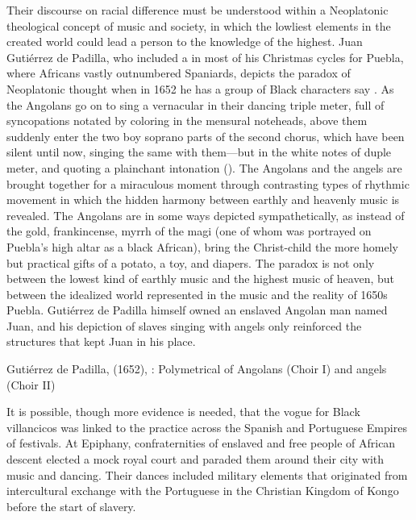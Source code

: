 Their discourse on racial difference must be understood within a Neoplatonic
theological concept of music and society, in which the lowliest elements in the
created world could lead a person to the knowledge of the highest.
Juan Gutiérrez de Padilla, who included a  in most of
his Christmas cycles for Puebla, where Africans vastly outnumbered Spaniards,
depicts the paradox of Neoplatonic thought when in 1652 he has a group of
Black characters say .%
   \Autocite{Sierra:UrbanSlavery} 
As the Angolans go on to sing a vernacular  in their
dancing triple meter, full of syncopations notated by coloring in the mensural
noteheads, above them suddenly enter the two boy soprano parts of the second
chorus, which have been silent until now, singing the same  with
them---but in the white notes of duple meter, and quoting a plainchant
intonation ().
The Angolans and the angels are brought together for a miraculous moment
through contrasting types of rhythmic movement in which the hidden harmony
between earthly and heavenly music is revealed.
The Angolans are in some ways depicted sympathetically, as instead
of the gold, frankincense, myrrh of the magi (one of whom was portrayed on
Puebla's high altar as a black African), bring the Christ-child the more homely
but practical gifts of a potato, a toy, and diapers.
The paradox is not only between the lowest kind of earthly music and the
highest music of heaven, but between the idealized world represented in the
music and the reality of 1650s Puebla.
Gutiérrez de Padilla himself owned an enslaved Angolan man named Juan, and
his depiction of slaves singing with angels only reinforced the structures that
kept Juan in his place.%
    \Autocite{Mauleon:PadillaCivil}


{Gutiérrez de Padilla,  (1652), :
Polymetrical  of Angolans (Choir I) and angels (Choir II)}

It is possible, though more evidence is needed, that the vogue for Black
villancicos was linked to the practice across the Spanish and Portuguese
Empires of  festivals.
At Epiphany, confraternities of enslaved and free people of African descent
elected a mock royal court and paraded them around their city with music and
dancing.%
    \Autocites
    {Fromont:DancingKingCongo}
    {Fromont:Kongo}
Their dances included military elements that originated from intercultural
exchange with the Portuguese in the Christian Kingdom of Kongo before the start
of slavery.

